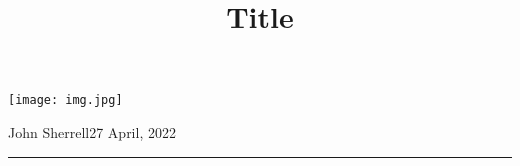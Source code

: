 \documentclass[11pt, letterpaper]{article}{\twocolumn}
\title{\vspace{-2.5em}Title\\\vspace{-.2em}{\normalsize \url{https://jomsh.cc}}}
\author{\vspace{-4em}}
\date{\vspace{-4em}}
\begin{document}
\maketitle

\vspace{-1.5em}

\begin{center}
\texttt{[image: img.jpg]}
\end{center}

\vspace{-1em}

\noindent
John Sherrell\hfill{\small 27 April, 2022}
\hrule

\vspace{2em}

\thispagestyle{empty}

\blindtext

\blindtext

\blindtext

\blindtext
\end{document}
